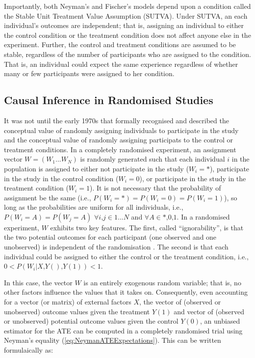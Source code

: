 \documentclass[12pt]{article}
\newcommand{\mc}{\textrm{,}}
\newcommand{\mc}{\textrm{,}}
\begin{document}
Importantly, both Neyman's and Fischer's models depend upon a condition called the Stable Unit Treatment Value Assumption (SUTVA). Under SUTVA, an each individual's outcomes are independent; that is, assigning an individual to either the control condition or the treatment condition does not affect anyone else in the experiment. Further, the control and treatment conditions are assumed to be stable, regardless of the number of participants who are assigned to the condition. That is, an individual could expect the same experience regardless of whether many or few participants were assigned to her condition.

\subsection{Causal Inference in Randomised Studies}

It was not until the early 1970s that \citet{rubinEstimatingCausalEffects1974} formally recognised and described the conceptual value of randomly assigning individuals to participate in the study and the conceptual value of randomly assigning participats to the control or treatment conditions. In a completely randomised experiment, an assignment vector $W = (W_1 ... W_N)$ is randomly generated such that each individual $i$ in the population is assigned to either not participate in the study ($W_i=*$), participate in the study in the control condition ($W_i=0$), or participate in the study in the treatment condition ($W_i=1$). It is not necessary that the probability of assignment be the same (i.e., $P(W_i = *) = P(W_i = 0) = P(W_i = 1)$), so long as the probabilities are uniform for all individuals, i.e., $P(W_i = A) = P(W_j = A)$ $\forall i \mc j \in {1...N}$ and $\forall A \in {* \mc 0 \mc 1}$. In a randomised experiment, $W$ exhibits two key features. The first, called ``ignorability'', is that the two potential outcomes for each participant (one observed and one unobserved) is independent of the randomisation \citep{rubinEstimatingCausalEffects1974}. The second is that each individual could be assigned to either the control or the treatment condition, i.e., $0 < P(W_i|X \mc Y() \mc Y(1)) < 1$.

In this case, the vector $W$ is an entirely exogenous random variable; that is, no other factors influence the values that it takes on. Consequently, even accounting for a vector (or matrix) of external factors $X$, the vector of (observed or unobserved) outcome values given the treatment $Y(1)$ and vector of (observed or unobserved) potential outcome values given the control $Y(0)$, an unbiased estimator for the ATE can be computed in a completely randomised trial using Neyman's equality (\ref{eq:NeymanATEExpectations}). This can be written formulaically as:
\end{document}
